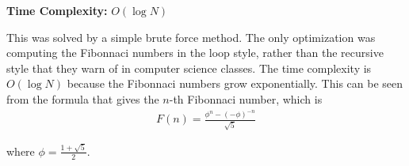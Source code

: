 \documentclass[12pt]{article}
\begin{document}
 
\noindent
\textbf{Time Complexity:} $O(\log N)$

\noindent
This was solved by a simple brute force method. The only optimization was computing the Fibonnaci numbers
in the loop style, rather than the recursive style that they warn of in computer science classes. The time
complexity is $O(\log N)$ because the Fibonnaci numbers grow exponentially. This can be seen from the formula
that gives the $n$-th Fibonnaci number, which is
\begin{align*}
  F(n) = \frac{\phi^n - (-\phi)^{-n}}{\sqrt{5}}
\end{align*}

\noindent
where $\phi = \frac{1 + \sqrt{5}}{2}$.
\end{document}
